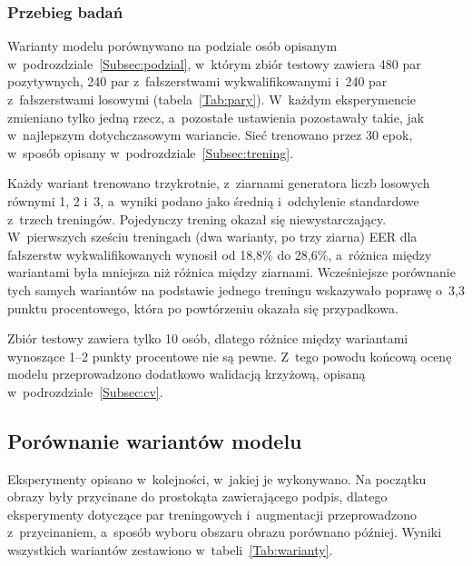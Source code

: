 \documentclass[12pt, twoside, openright]{article}
\begin{document}
\subsubsection*{Przebieg badań}

Warianty modelu porównywano na podziale osób opisanym w~podrozdziale~\ref{Subsec:podzial}, w~którym zbiór testowy zawiera 480 par pozytywnych, 240 par z~fałszerstwami wykwalifikowanymi i~240 par z~fałszerstwami losowymi (tabela~\ref{Tab:pary}).
W~każdym eksperymencie zmieniano tylko jedną rzecz, a~pozostałe ustawienia pozostawały takie, jak w~najlepszym dotychczasowym wariancie.
Sieć trenowano przez 30 epok, w~sposób opisany w~podrozdziale~\ref{Subsec:trening}.

Każdy wariant trenowano trzykrotnie, z~ziarnami generatora liczb losowych równymi 1, 2 i~3, a~wyniki podano jako średnią i~odchylenie standardowe z~trzech treningów.
Pojedynczy trening okazał się niewystarczający.
W~pierwszych sześciu treningach (dwa warianty, po trzy ziarna) EER dla fałszerstw wykwalifikowanych wynosił od 18,8\% do 28,6\%, a~różnica między wariantami była mniejsza niż różnica między ziarnami.
Wcześniejsze porównanie tych samych wariantów na podstawie jednego treningu wskazywało poprawę o~3,3 punktu procentowego, która po powtórzeniu okazała się przypadkowa.

Zbiór testowy zawiera tylko 10 osób, dlatego różnice między wariantami wynoszące 1--2 punkty procentowe nie są pewne.
Z~tego powodu końcową ocenę modelu przeprowadzono dodatkowo walidacją krzyżową, opisaną w~podrozdziale~\ref{Subsec:cv}.

\subsection{Porównanie wariantów modelu}
\label{Subsec:warianty}

Eksperymenty opisano w~kolejności, w~jakiej je wykonywano.
Na początku obrazy były przycinane do prostokąta zawierającego podpis, dlatego eksperymenty dotyczące par treningowych i~augmentacji przeprowadzono z~przycinaniem, a~sposób wyboru obszaru obrazu porównano później.
Wyniki wszystkich wariantów zestawiono w~tabeli~\ref{Tab:warianty}.
\end{document}
